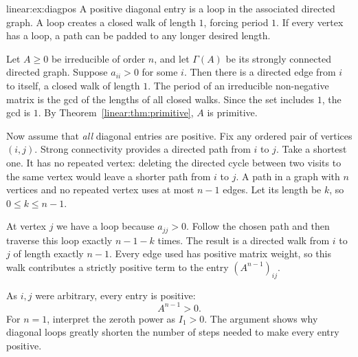 \begin{solution}{linear:ex:diagpos}
\idea A positive diagonal entry is a loop in the associated directed graph. A loop creates a closed walk of length $1$, forcing period $1$. If every vertex has a loop, a path can be padded to any longer desired length.

\writeup Let $A\ge0$ be irreducible of order $n$, and let $\Gamma(A)$ be its strongly connected directed graph. Suppose $a_{ii}>0$ for some $i$. Then there is a directed edge from $i$ to itself, a closed walk of length $1$. The period of an irreducible non-negative matrix is the gcd of the lengths of all closed walks. Since the set includes $1$, the gcd is $1$. By Theorem~\ref{linear:thm:primitive}, $A$ is primitive.

Now assume that \emph{all} diagonal entries are positive. Fix any ordered pair of vertices $(i,j)$. Strong connectivity provides a directed path from $i$ to $j$. Take a shortest one. It has no repeated vertex: deleting the directed cycle between two visits to the same vertex would leave a shorter path from $i$ to $j$. A path in a graph with $n$ vertices and no repeated vertex uses at most $n-1$ edges. Let its length be $k$, so $0\le k\le n-1$.

At vertex $j$ we have a loop because $a_{jj}>0$. Follow the chosen path and then traverse this loop exactly $n-1-k$ times. The result is a directed walk from $i$ to $j$ of length exactly $n-1$. Every edge used has positive matrix weight, so this walk contributes a strictly positive term to the entry $(A^{n-1})_{ij}$.

As $i,j$ were arbitrary, every entry is positive:
\[
\boxed{A^{n-1}>0}.
\]
For $n=1$, interpret the zeroth power as $I_1>0$. The argument shows why diagonal loops greatly shorten the number of steps needed to make every entry positive.
\end{solution}

